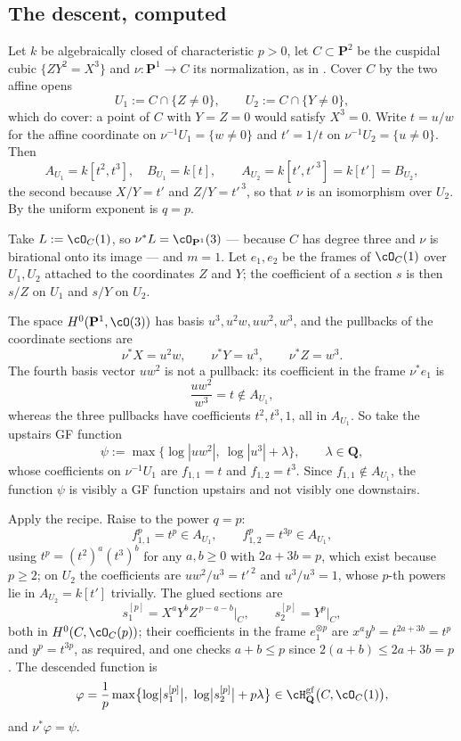 \subsection{The descent, computed}
\label{sec:ch43-gf-descent-example}

\begin{example}
\label{ex:ch43-cusp-gf-descent}
Let $k$ be algebraically closed of characteristic $p>0$, let
$C\subset\mathbf P^2$ be the cuspidal cubic
$\{ZY^2=X^3\}$ and $\nu:\mathbf P^1\to C$ its normalization, as in
.  Cover $C$ by the two affine opens
\[
 U_1:=C\cap\{Z\ne0\},
 \qquad
 U_2:=C\cap\{Y\ne0\},
\]
which do cover: a point of $C$ with $Y=Z=0$ would satisfy $X^3=0$.
Write $t=u/w$ for the affine coordinate on $\nu^{-1}U_1=\{w\ne0\}$ and
$t'=1/t$ on $\nu^{-1}U_2=\{u\ne0\}$.  Then
\[
 A_{U_1}=k[t^2,t^3],\quad B_{U_1}=k[t],
 \qquad
 A_{U_2}=k[t',t'^{\,3}]=k[t']=B_{U_2},
\]
the second because $X/Y=t'$ and $Z/Y=t'^{\,3}$, so that $\nu$ is an
isomorphism over $U_2$.  By  the uniform
exponent is $q=p$.

Take $L:=\cO_C(1)$, so $\nu^*L=\cO_{\mathbf P^1}(3)$ --- because $C$
has degree three and $\nu$ is birational onto its image --- and $m=1$.
Let $e_1,e_2$ be the frames of $\cO_C(1)$ over $U_1,U_2$ attached to
the coordinates $Z$ and $Y$; the coefficient of a section $s$ is then
$s/Z$ on $U_1$ and $s/Y$ on $U_2$.

The space $H^0(\mathbf P^1,\cO(3))$ has basis $u^3,u^2w,uw^2,w^3$, and
the pullbacks of the coordinate sections are
\[
 \nu^*X=u^2w,
 \qquad
 \nu^*Y=u^3,
 \qquad
 \nu^*Z=w^3 .
\]
The fourth basis vector $uw^2$ is not a pullback: its coefficient in the
frame $\nu^*e_1$ is
\[
 \frac{uw^2}{w^3}=t\notin A_{U_1},
\]
whereas the three pullbacks have coefficients $t^2,t^3,1$, all in
$A_{U_1}$.  So take the upstairs GF function
\[
 \psi:=\max\bigl\{\log|uw^2|,\ \log|u^3|+\lambda\bigr\},
 \qquad
 \lambda\in\mathbf Q,
\]
whose coefficients on $\nu^{-1}U_1$ are
$f_{1,1}=t$ and $f_{1,2}=t^3$.  Since $f_{1,1}\notin A_{U_1}$, the
function $\psi$ is visibly a GF function upstairs and not visibly one
downstairs.

Apply the recipe.  Raise to the power $q=p$:
\[
 f_{1,1}^p=t^p\in A_{U_1},
 \qquad
 f_{1,2}^p=t^{3p}\in A_{U_1},
\]
using $t^p=(t^2)^a(t^3)^b$ for any $a,b\ge0$ with $2a+3b=p$, which
exist because $p\ge2$; on $U_2$ the coefficients are
$uw^2/u^3=t'^{\,2}$ and $u^3/u^3=1$, whose $p$-th powers lie in
$A_{U_2}=k[t']$ trivially.  The glued sections are
\[
 s_1^{[p]}=X^aY^bZ^{\,p-a-b}\big|_C,
 \qquad
 s_2^{[p]}=Y^p\big|_C,
\]
both in $H^0(C,\cO_C(p))$; their coefficients in the frame
$e_1^{\otimes p}$ are $x^ay^b=t^{2a+3b}=t^p$ and $y^p=t^{3p}$, as
required, and one checks $a+b\le p$ since $2(a+b)\le2a+3b=p$.  The
descended function is
\[
 \varphi=\frac1p\max\bigl\{\log\bigl|s_1^{[p]}\bigr|,\
   \log\bigl|s_2^{[p]}\bigr|+p\lambda\bigr\}
 \in\cH^{\mathrm{gf}}_{\mathbf Q}\bigl(C,\cO_C(1)\bigr),
\]
and $\nu^*\varphi=\psi$.


\end{example}
